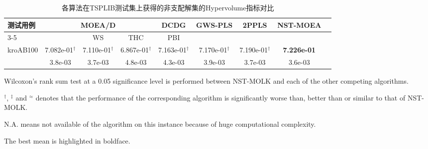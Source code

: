 \begin{table}[ht]
      \small
      \renewcommand\tabcolsep{4.5pt}
      \centering
      \caption{各算法在TSPLIB测试集上获得的非支配解集的Hypervolume指标对比 \label{tab:各算法在TSPLIB测试集上获得的非支配解集的Hypervolume指标对比}}
      \begin{threeparttable}
            \begin{tabular}{lcccccccc}
                  \toprule
                  \multirow{2}[4]{*}{测试用例} & \multicolumn{3}{c}{MOEA/D} & \multicolumn{1}{c}{\multirow{2}[4]{*}{DCDG}} & \multicolumn{1}{c}{\multirow{2}[4]{*}{GWS-PLS}} & \multicolumn{1}{c}{\multirow{2}[4]{*}{2PPLS}} & \multicolumn{1}{c}{\multirow{2}[4]{*}{NST-MOEA}} \\
      \cmidrule{3-5}          &       & \multicolumn{1}{c}{WS} & \multicolumn{1}{c}{THC} & \multicolumn{1}{c}{PBI} &       &       &  \\
                  \midrule
                  \multirow{2}{*}{kroAB100}             & 7.082e-01$^{\dag}$ & 7.110e-01$^{\dag}$ & 6.867e-01$^{\dag}$ & 7.163e-01$^{\dag}$ & 7.170e-01$^{\dag}$ & 7.190e-01$^{\dag}$ & \textbf{7.226e-01} \\
                                                            & 3.8e-03            & 3.7e-03            & 4.8e-03            & 4.3e-03            & 3.9e-03            & 3.7e-03            & 3.6e-03            \\
                  \bottomrule
            \end{tabular}
            \begin{tablenotes}
                  \item[] Wilcoxon’s rank sum test at a 0.05 significance level is performed between NST-MOLK and each of the other competing algorithms.
                  \item[] $^\dag$, $^\ddag$ and $^\approx$ denotes that the performance of the corresponding algorithm is significantly worse than, better than or similar to that of NST-MOLK.
                  \item[] N.A. means not available of the algorithm on this instance because of huge computational complexity.
                  \item[] The best mean is highlighted in boldface.
            \end{tablenotes}
      \end{threeparttable}
\end{table}

